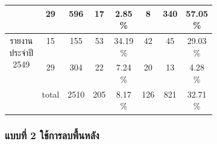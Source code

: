 \begin{table}[H]
\begin{tabular}{|c|c|c|p{0.1\linewidth}|p{0.1\linewidth}|c|p{0.1\linewidth}|p{0.1\linewidth}|}
                                            & 29    & 596       & \multicolumn{1}{c|}{17 }         & \multicolumn{1}{c|}{2.85 \% } & \multicolumn{1}{c|}{8  }    & \multicolumn{1}{c|}{340}             & \multicolumn{1}{c|}{57.05 \%} \\ \hline
        \multirow{2}{*}{รายงานประจำปี 2549}   & 15    & 155       & \multicolumn{1}{c|}{53 }         & \multicolumn{1}{c|}{34.19 \%}  &\multicolumn{1}{c|}{42}     &\multicolumn{1}{c|}{45}              &\multicolumn{1}{c|}{29.03 \%} \\ \cline{2-8} 
                                            & 29    & 304       & \multicolumn{1}{c|}{22 }         & \multicolumn{1}{c|}{7.24 \% } & \multicolumn{1}{c|}{20 }    & \multicolumn{1}{c|}{13 }             & \multicolumn{1}{c|}{4.28 \%}\\ \hline
        \multicolumn{1}{|l|}{}              & total & 2510      & \multicolumn{1}{c|}{205}         & \multicolumn{1}{c|}{8.17 \% } & \multicolumn{1}{c|}{126}    & \multicolumn{1}{c|}{821}             & \multicolumn{1}{c|}{32.71 \%} \\ \hline
        \end{tabular}
        \end{table}

\subsubsection{แบบที่ 2 ใช้การลบพื้นหลัง}

